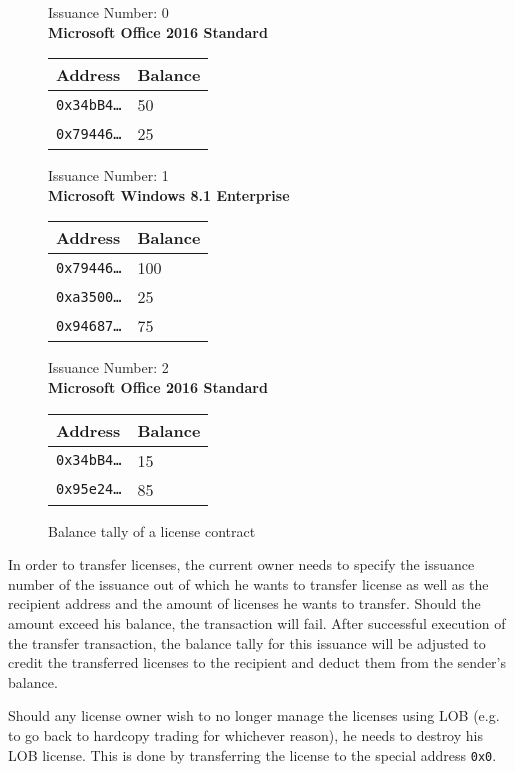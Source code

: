 \documentclass[a4paper]{article}
\begin{document}
\begin{figure}
  \begin{multicols}{3}
    \centering
    Issuance Number: 0 \\
    \textbf{Microsoft Office 2016 Standard} \\[3mm]
    
    \begin{tabular}{l|l}
      Address & Balance \\
      \hline
      \texttt{0x34bB4…} & 50 \\
      \texttt{0x79446…} & 25
    \end{tabular}
    
    \columnbreak
    
    Issuance Number: 1 \\
    \textbf{Microsoft Windows 8.1 Enterprise} \\[3mm]
    \begin{tabular}{l|l}
      Address & Balance \\
      \hline
      \texttt{0x79446…} & 100 \\
      \texttt{0xa3500…} & 25 \\
      \texttt{0x94687…} & 75 \\
    \end{tabular}
    
    Issuance Number: 2 \\
    \textbf{Microsoft Office 2016 Standard} \\[3mm]
    \begin{tabular}{l|l}
      Address & Balance \\
      \hline
      \texttt{0x34bB4…} & 15 \\
      \texttt{0x95e24…} & 85
    \end{tabular}
  \end{multicols}
  \caption{Balance tally of a license contract}
  \label{fig:balanceTally}
\end{figure}

In order to transfer licenses, the current owner needs to specify the issuance number of the issuance out of which he wants to transfer license as well as the recipient address and the amount of licenses he wants to transfer. Should the amount exceed his balance, the transaction will fail. After successful execution of the transfer transaction, the balance tally for this issuance will be adjusted to credit the transferred licenses to the recipient and deduct them from the sender's balance.

Should any license owner wish to no longer manage the licenses using LOB (e.g. to go back to hardcopy trading for whichever reason), he needs to destroy his LOB license. This is done by transferring the license to the special address \texttt{0x0}.
\end{document}
